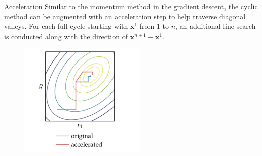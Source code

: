 \documentclass{beamer}
\begin{document}
\begin{frame}{Acceleration}
Similar to the momentum method in the gradient descent, the cyclic method can be augmented with an acceleration step to help traverse diagonal valleys. For each full cycle starting with $\boldsymbol{x}^1$ from 1 to $n$, an additional line search is conducted along with 
the direction of $\boldsymbol{x}^{n+1}-\boldsymbol{x}^1$.

\begin{figure}
\centering
\includegraphics[width=60mm]{Figs/coordinate-improved.jpeg}
\end{figure} 

\end{frame}
\end{document}
